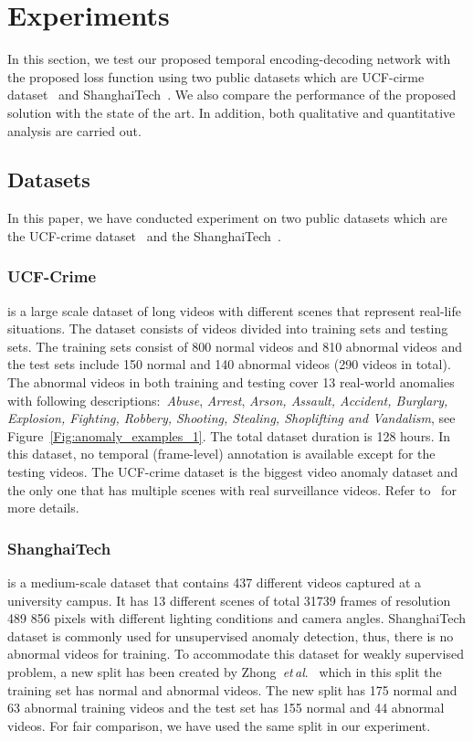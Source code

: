 \documentclass[journal]{IEEEtran}
\newcommand{\authorcite}{{\textit{et}\,\textit{al}.}}
\begin{document}
\section{Experiments}
In this section, we test our proposed temporal encoding-decoding network with the proposed loss function using two public datasets which are UCF-cirme dataset~\cite{sultani2018real} and ShanghaiTech~\cite{luo2017revisit}. We also compare the performance of the proposed solution with the state of the art. In addition, both qualitative and quantitative analysis are carried out.

\subsection{Datasets}
In this paper, we have conducted experiment on two public datasets which are the UCF-crime dataset~\cite{sultani2018real} and the ShanghaiTech~\cite{luo2017revisit}. 
\subsubsection{UCF-Crime} is a large scale dataset of long videos with different scenes that represent real-life situations. The dataset consists of  videos divided into training sets and testing sets. The training sets consist of 800 normal videos and 810 abnormal videos and the test sets include 150 normal and 140 abnormal videos (290 videos in total). The abnormal videos in both training and testing cover 13 real-world anomalies with following descriptions:~\textit{Abuse},\textit{ Arrest}, \textit{Arson, Assault, Accident, Burglary, Explosion, Fighting, Robbery, Shooting, Stealing, Shoplifting and Vandalism}, see Figure~\ref{Fig:anomaly_examples_1}. The total dataset duration is 128 hours. In this dataset, no temporal (frame-level) annotation is available except for the testing videos. The UCF-crime dataset is the biggest video anomaly dataset and the only one that has multiple scenes with real surveillance videos. Refer to~\cite{sultani2018real} for more details.
\subsubsection{ShanghaiTech} is a medium-scale dataset that contains 437 different videos captured at a university campus. It has 13 different scenes of total 31739 frames of resolution 489 856 pixels with different lighting conditions and camera angles. ShanghaiTech dataset is commonly used for unsupervised anomaly detection, thus, there is no abnormal videos for training.  To accommodate this dataset for weakly supervised problem, a new split has been created by Zhong~\authorcite~\cite{Zhong_2019_CVPR} which in this split the training set has normal and abnormal videos. The new split has 175 normal and 63 abnormal training videos and the test set has 155 normal and 44 abnormal videos. For fair comparison, we have used the same split in our experiment.
\end{document}
